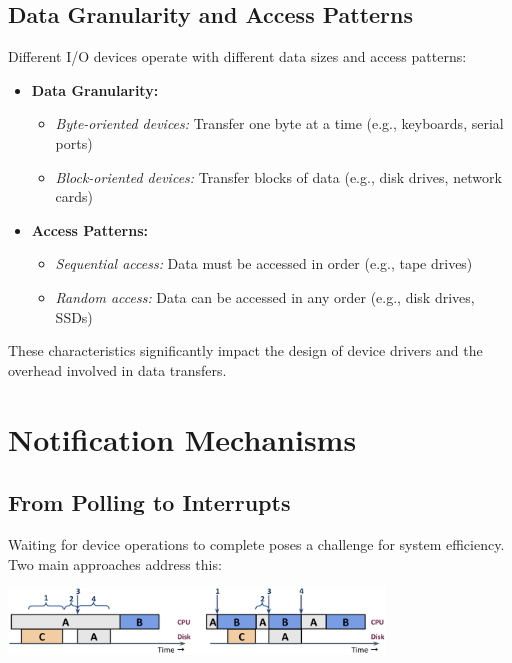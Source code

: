 \documentclass[../../compsys.tex]{subfiles}
\begin{document}
\subsection{Data Granularity and Access Patterns}

Different I/O devices operate with different data sizes and access patterns:

\begin{itemize}
    \item \textbf{Data Granularity:}
    \begin{itemize}
        \item \textit{Byte-oriented devices:} Transfer one byte at a time (e.g., keyboards, serial ports)
        \item \textit{Block-oriented devices:} Transfer blocks of data (e.g., disk drives, network cards)
    \end{itemize}

    \item \textbf{Access Patterns:}
    \begin{itemize}
        \item \textit{Sequential access:} Data must be accessed in order (e.g., tape drives)
        \item \textit{Random access:} Data can be accessed in any order (e.g., disk drives, SSDs)
    \end{itemize}
\end{itemize}

These characteristics significantly impact the design of device drivers and the overhead involved in data transfers.

\section{Notification Mechanisms}

\subsection{From Polling to Interrupts}

Waiting for device operations to complete poses a challenge for system efficiency. Two main approaches address this:

\begin{center}
  \includegraphics[width=0.75\textwidth]{chapters/L8/images/device_protocol.png}
\end{center}
\end{document}
